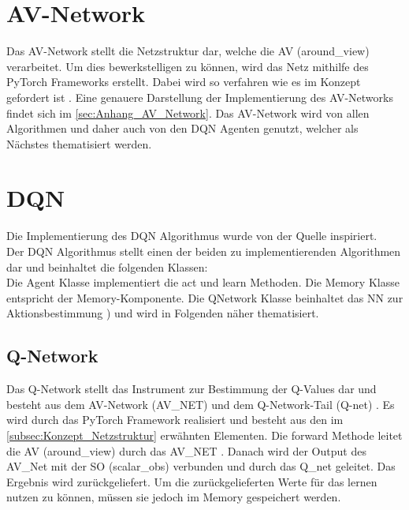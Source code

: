 \section{AV-Network} \label{sec:Implementierung_AV_Network}
Das AV-Network stellt die Netzstruktur dar, welche die AV (around\_view) verarbeitet. Um dies bewerkstelligen zu können, wird das Netz mithilfe des PyTorch Frameworks erstellt. Dabei wird so verfahren wie es im Konzept gefordert ist . Eine genauere Darstellung der Implementierung des AV-Networks findet sich im  \autoref{sec:Anhang_AV_Network}. Das AV-Network wird von allen Algorithmen und daher auch von den DQN Agenten genutzt, welcher als Nächstes thematisiert werden.

\section{DQN} \label{sec:Implementierung_DQN}
Die Implementierung des DQN Algorithmus wurde von der Quelle \citep{Charles2013} inspiriert.\\
Der DQN Algorithmus stellt einen der beiden zu implementierenden Algorithmen dar und beinhaltet die folgenden Klassen:\\
Die Agent Klasse implementiert die act  und learn  Methoden.
Die Memory Klasse entspricht der Memory-Komponente. Die QNetwork Klasse beinhaltet das NN zur Aktionsbestimmung ) und wird in Folgenden näher thematisiert.

\subsection{Q-Network} \label{subsec:Implementierung_Q-Network}
Das Q-Network stellt das Instrument zur Bestimmung der Q-Values dar und besteht aus dem AV-Network (AV\_NET)  und dem Q-Network-Tail (Q-net) .
Es wird durch das PyTorch Framework realisiert und besteht aus den im \autoref{subsec:Konzept_Netzstruktur} erwähnten Elementen.
Die forward Methode leitet die AV (around\_view) durch das AV\_NET . Danach wird der Output des AV\_Net mit der SO (scalar\_obs) verbunden und durch das Q\_net geleitet. Das Ergebnis wird zurückgeliefert. Um die zurückgelieferten Werte für das lernen nutzen zu können, müssen sie jedoch im Memory gespeichert werden.

